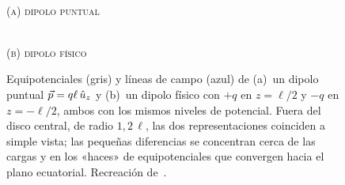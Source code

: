 \begin{figure}[ht]
\centering
\begin{minipage}[t]{0.49\textwidth}\centering
{}\\[1pt]{\small\scshape (a)\; dipolo puntual}
\end{minipage}\hfill
\begin{minipage}[t]{0.49\textwidth}\centering
{}\\[1pt]{\small\scshape (b)\; dipolo físico}
\end{minipage}
\caption{Equipotenciales (gris) y líneas de campo (azul) de (a)~un dipolo puntual $\vec{p}=q\ell\,\hat{u}_{z}$ y (b)~un dipolo físico con $+q$ en
$z=\ell/2$ y $-q$ en $z=-\ell/2$, ambos con los mismos niveles de potencial. Fuera del disco central, de radio $1{,}2\,\ell$, las dos
representaciones coinciden a simple vista; las pequeñas diferencias se concentran cerca de las cargas y en los «haces» de equipotenciales que
convergen hacia el plano ecuatorial. Recreación de~\cite{FIGURAS-T2}.}
\label{fig:fisico-puntual}
\end{figure}
